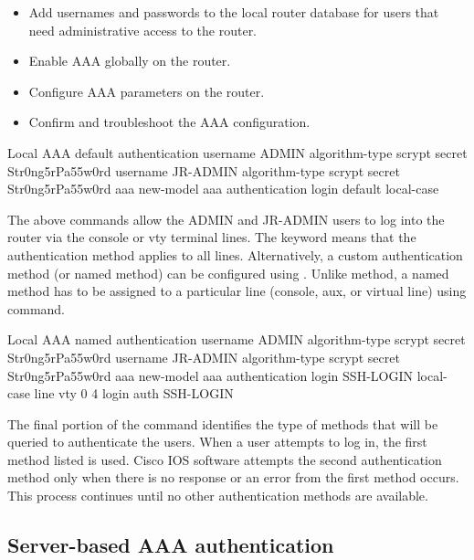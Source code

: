 \begin{itemize}
  \item Add usernames and passwords to the local router database for users that need administrative access to the router.
  \item Enable AAA globally on the router.
  \item Configure AAA parameters on the router.
  \item Confirm and troubleshoot the AAA configuration.  
\end{itemize}

\begin{sexylisting}{Local AAA default authentication}
username ADMIN algorithm-type scrypt secret Str0ng5rPa55w0rd
username JR-ADMIN algorithm-type scrypt secret Str0ng5rPa55w0rd
aaa new-model
aaa authentication login default local-case
\end{sexylisting}

The above commands allow the ADMIN and JR-ADMIN users to log into the router via the console or vty terminal lines. The  keyword means that the authentication method applies to all lines. Alternatively, a custom authentication method (or named method) can be configured using . Unlike  method, a named method has to be assigned to a particular line (console, aux, or virtual line) using  command.\\ 

\begin{sexylisting}{Local AAA named authentication}
  username ADMIN algorithm-type scrypt secret Str0ng5rPa55w0rd
  username JR-ADMIN algorithm-type scrypt secret Str0ng5rPa55w0rd
  aaa new-model
  aaa authentication login SSH-LOGIN local-case
  line vty 0 4
  login auth SSH-LOGIN
  \end{sexylisting}

The final portion of the command identifies the type of methods that will be queried to authenticate the users. When a user attempts to log in, the first method listed is used. Cisco IOS software attempts the second authentication method only when there is no response or an error from the first method occurs. This process continues until no other authentication methods are available.

\subsection{Server-based AAA authentication}

